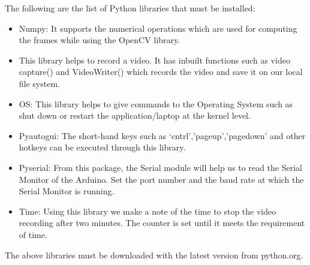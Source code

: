 \documentclass[12pt,journal]{IEEEtran}
\begin{document}
The following are the list of Python libraries that must be installed:
\bigskip
\begin{itemize}
  \item Numpy: It supports the numerical operations which are used for computing the frames while using the OpenCV library.
  \bigskip
  \item This library helps to record a video. It has inbuilt functions such as video capture() and VideoWriter() which records the video and save it on our local file system.
  \bigskip
  \item OS: This library helps to give commands to the Operating System such as shut down or restart the application/laptop at the kernel level.
  \bigskip
  \item Pyautogui: The short-hand keys such as ‘cntrl’,’pageup’,’pagedown’ and other hotkeys can be executed through this library.
  \bigskip
  \item Pyserial: From this package, the Serial module will help us to read the Serial Monitor of the Arduino. Set the port number and the baud rate at which the Serial Monitor is running.
  \bigskip
  \item Time: Using this library we make a note of the time to stop the video recording after two minutes. The counter is set until it meets the requirement of time.
\end{itemize}
\bigskip
\par The above libraries must be downloaded with the latest version from python.org. 
\end{document}
